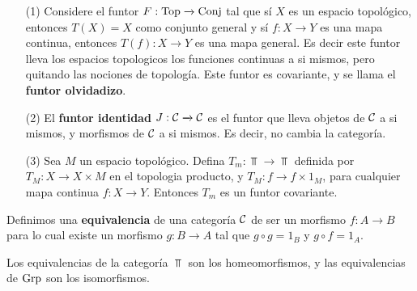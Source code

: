\begin{example}\label{}
    \begin{enumerate}
        \item[(1)] Considere el funtor $F:\operatorname{Top} \xrightarrow{} \operatorname{Conj}$ tal que
            s\'i $X$ es un espacio topol\'ogico, entonces  $T(X)=X$ como
            conjunto general y s\'i $f:X \xrightarrow{} Y$ es una mapa continua,
            entonces $T(f):X \xrightarrow{} Y$ es una mapa general. Es decir
            este funtor lleva los espacios topologicos los funciones continuas a
            si mismos, pero quitando las nociones de topolog\'ia. Este funtor es
            covariante, y se llama el \textbf{funtor olvidadizo}.

        \item[(2)] El \textbf{funtor identidad} $J:\mathcal{C} \xrightarrow{} \mathcal{C}$ es el
            funtor que lleva objetos de $\mathcal{C}$ a si mismos, y morfismos de $\mathcal{C}$
            a si mismos. Es decir, no cambia la categor\'ia.

        \item[(3)] Sea $M$ un espacio topol\'ogico. Defina  $T_m:\Top
            \xrightarrow{} \Top$ definida por $T_M:X \xrightarrow{} X \times M$
            en el topologia producto, y $T_M:f \xrightarrow{} f \times 1_M$,
            para cualquier mapa continua $f:X \xrightarrow{} Y$. Entonces $T_m$
            es un funtor covariante.
    \end{enumerate}
\end{example}

\begin{definition}
    Definimos una \textbf{equivalencia} de una categor\'ia $\mathcal{C}$ de ser un
    morfismo  $f:A \xrightarrow{} B$ para lo cual existe un morfismo $g:B
    \xrightarrow{} A$ tal que $g \circ g=1_B$ y  $g \circ f=1_A$.
\end{definition}

\begin{example}\label{}
    Los equivalencias de la categor\'ia $\Top$ son los homeomorfismos, y las
    equivalencias de  $\operatorname{Grp}$ son los isomorfismos.
\end{example}

